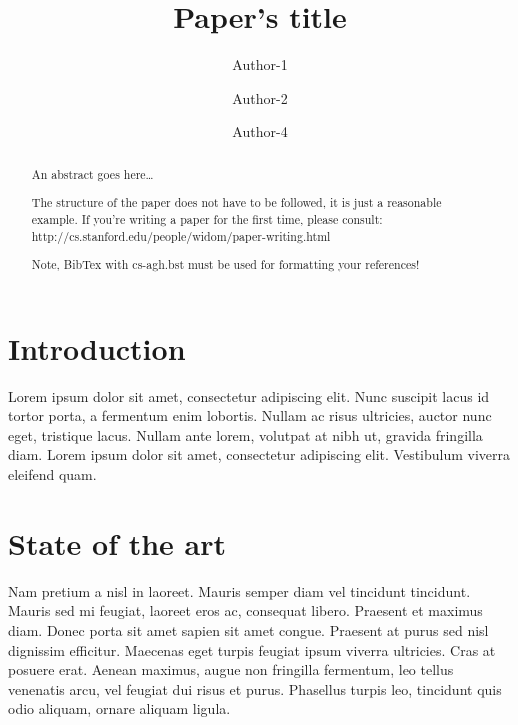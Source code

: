 \documentclass[10pt]{article}
\begin{document}
\begin{opening}

\title{Paper's title}

\author[Institution, address, the first author's e-mail address]{Author-1}

\author[Institution, address, the second author's e-mail address]{Author-2}

\author[Institution1, address1, the fourth author's e-mail address1
        Institution2, address2, the fourth author's e-mail address2,]{Author-4}

\begin{abstract}
  An abstract goes here\ldots
	
The structure of the paper does not have to be followed, it is just
a reasonable example. If you're writing a paper for the first time, please consult:
http://cs.stanford.edu/people/widom/paper-writing.html

Note, BibTex with cs-agh.bst must be used for formatting your references!
\end{abstract}


\end{opening}

\section{Introduction}

Lorem ipsum dolor sit amet, consectetur adipiscing elit. Nunc suscipit lacus id tortor porta, a fermentum enim lobortis. Nullam ac risus ultricies, auctor nunc eget, tristique lacus. Nullam ante lorem, volutpat at nibh ut, gravida fringilla diam. Lorem ipsum dolor sit amet, consectetur adipiscing elit. Vestibulum viverra eleifend quam.

\section{State of the art}

Nam pretium a nisl in laoreet. Mauris semper diam vel tincidunt tincidunt. Mauris sed mi feugiat, laoreet eros ac, consequat libero. Praesent et maximus diam. Donec porta sit amet sapien sit amet congue. Praesent at purus sed nisl dignissim efficitur. Maecenas eget turpis feugiat ipsum viverra ultricies. Cras at posuere erat. Aenean maximus, augue non fringilla fermentum, leo tellus venenatis arcu, vel feugiat dui risus et purus. Phasellus turpis leo, tincidunt quis odio aliquam, ornare aliquam ligula. 
\end{document}
